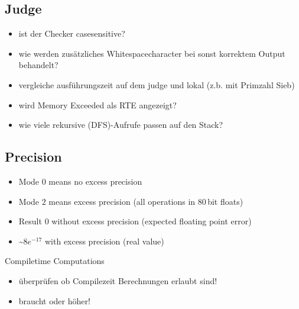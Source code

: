 \subsection{Judge}
\begin{itemize}
	\item ist der Checker casesensitive?
	\item wie werden zusätzliches Whitespacecharacter bei sonst korrektem Output behandelt?
	\item vergleiche ausführungszeit auf dem judge und lokal (z.b. mit Primzahl Sieb)
	\item wird Memory Exceeded als RTE angezeigt?
	\item wie viele rekursive (DFS)-Aufrufe passen auf den Stack?
\end{itemize}

\subsection{Precision}
\begin{itemize}
	\item Mode $0$ means no excess precision
	\item Mode $2$ means excess precision (all operations in $80$\,bit floats)
\end{itemize}
\begin{itemize}
	\item Result $0$ without excess precision (expected floating point error)
	\item \textasciitilde$8e^{-17}$ with excess precision (real value)
\end{itemize}

\begin{algorithm}{Compiletime Computations}
	\begin{itemize}
		\item überprüfen ob Compilezeit Berechnungen erlaubt sind!
		\item braucht  oder höher!
	\end{itemize}
\end{algorithm}
